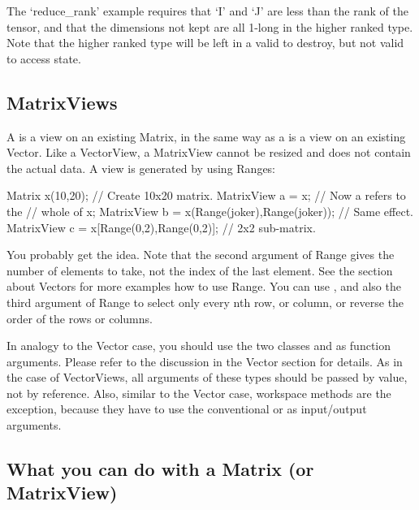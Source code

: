 The `reduce\_rank' example requires that `I' and `J' are less than the rank of the tensor,
and that the dimensions not kept are all 1-long in the higher ranked type.  Note that the
higher ranked type will be left in a valid to destroy, but not valid to access state.

\subsection{MatrixViews}

A  is a view on an existing Matrix, in the same way
as a  is a view on an existing Vector. Like a
VectorView, a MatrixView cannot be resized and does not contain the
actual data. A view is generated by using Ranges:

\begin{code}
Matrix x(10,20);                  // Create 10x20 matrix.
MatrixView a = x;                 // Now a refers to the
                                  // whole of x;
MatrixView b = x(Range(joker),Range(joker));
                                  // Same effect.
MatrixView c = x[Range(0,2),Range(0,2)];
                                  // 2x2 sub-matrix.
\end{code}

You probably get the idea. Note that the second argument of Range gives
the number of elements to take, not the index of the last element. See
the section about Vectors for more examples how to use Range. You can
use , and also the third argument of Range to select only
every nth row, or column, or reverse the order of the rows or columns.

In analogy to the Vector case, you should use the two classes
 and  as function arguments.
Please refer to the discussion in the Vector section for details. As
in the case of VectorViews, all arguments of these types should be
passed by value, not by reference. Also, similar to the Vector case,
workspace methods are the exception, because they have to use the
conventional  or  as input/output
arguments.

\subsection{What you can do with a Matrix (or MatrixView)}

